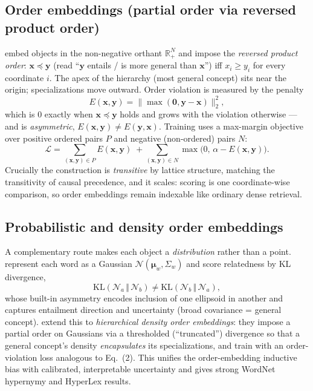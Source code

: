 \subsection{Order embeddings (partial order via reversed product order)}
\citet{geo:vendrov2016order} embed objects in the non-negative orthant
$\mathbb{R}^N_{+}$ and impose the \emph{reversed product order}: $\mathbf{x}
\preceq \mathbf{y}$ (read ``$\mathbf{y}$ entails / is more general than
$\mathbf{x}$'') iff $x_i \geq y_i$ for every coordinate $i$. The apex of the
hierarchy (most general concept) sits near the origin; specializations move
outward. Order violation is measured by the penalty
\begin{equation}
E(\mathbf{x},\mathbf{y}) = \big\lVert \max(\mathbf{0}, \mathbf{y}-\mathbf{x})
\big\rVert_2^2 ,
\end{equation}
which is $0$ exactly when $\mathbf{x}\preceq\mathbf{y}$ holds and grows with the
violation otherwise --- and is \emph{asymmetric}, $E(\mathbf{x},\mathbf{y})\neq
E(\mathbf{y},\mathbf{x})$. Training uses a max-margin objective over positive
ordered pairs $P$ and negative (non-ordered) pairs $N$:
\begin{equation}
\mathcal{L} = \!\!\sum_{(\mathbf{x},\mathbf{y})\in P}\!\! E(\mathbf{x},\mathbf{y})
\;+\!\! \sum_{(\mathbf{x},\mathbf{y})\in N}\!\! \max\!\big(0,\, \alpha -
E(\mathbf{x},\mathbf{y})\big).
\end{equation}
Crucially the construction is \emph{transitive} by lattice structure, matching
the transitivity of causal precedence, and it scales: scoring is one
coordinate-wise comparison, so order embeddings remain indexable like ordinary
dense retrieval.

\subsection{Probabilistic and density order embeddings}
A complementary route makes each object a \emph{distribution} rather than a
point. \citet{geo:vilnis2015gaussian} represent each word as a Gaussian
$\mathcal{N}(\boldsymbol{\mu}_w,\Sigma_w)$ and score relatedness by KL
divergence,
\begin{equation}
\mathrm{KL}\!\left(\mathcal{N}_a \,\Vert\, \mathcal{N}_b\right) \neq
\mathrm{KL}\!\left(\mathcal{N}_b \,\Vert\, \mathcal{N}_a\right),
\end{equation}
whose built-in asymmetry encodes inclusion of one ellipsoid in another and
captures entailment direction and uncertainty (broad covariance = general
concept). \citet{geo:athiwaratkun2018density} extend this to
\emph{hierarchical density order embeddings}: they impose a partial order on
Gaussians via a thresholded (``truncated'') divergence so that a general
concept's density \emph{encapsulates} its specializations, and train with an
order-violation loss analogous to Eq.~(2). This unifies the order-embedding
inductive bias with calibrated, interpretable uncertainty and gives strong
WordNet hypernymy and HyperLex results.

